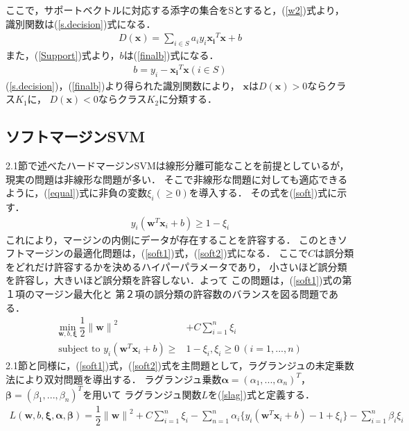 ここで，サポートベクトルに対応する添字の集合をSとすると，(\ref{w2})式より，
識別関数は(\ref{s.decision})式になる．
\begin{align}
    \label{s.decision}
    D(\boldsymbol{x}) = \sum_{i\in S}a_iy_i\boldsymbol{x_i}^T\boldsymbol{x} + b
\end{align}
また，(\ref{Support})式より，$b$は(\ref{finalb})式になる．
\begin{align}
  \label{finalb}
  b =y_i - \boldsymbol{x_i}^T\boldsymbol{x}(i \in S)
\end{align}
(\ref{s.decision})，(\ref{finalb})より得られた識別関数により，
$\boldsymbol{x}$は$D(\boldsymbol{x}) > 0$ならクラス$K_1$に，
$D(\boldsymbol{x}) < 0$ならクラス$K_2$に分類する．

\subsection{ソフトマージンSVM}
2.1節で述べたハードマージンSVMは線形分離可能なことを前提としているが，現実の問題は非線形な問題が多い．
そこで非線形な問題に対しても適応できるように，(\ref{equal})式に非負の変数$\xi_i(\geq 0)$を導入する．
その式を(\ref{soft})式に示す．
\begin{align}
    \label{soft}
    y_i(\boldsymbol{w}^T \boldsymbol{x}_i + b) \geq 1 - \xi_i
\end{align}
これにより，マージンの内側にデータが存在することを許容する．
このときソフトマージンの最適化問題は，(\ref{soft1})式，(\ref{soft2})式になる．
ここで$C$は誤分類をどれだけ許容するかを決めるハイパーパラメータであり，
小さいほど誤分類を許容し，大きいほど誤分類を許容しない．よって
この問題は，(\ref{soft1})式の第１項のマージン最大化と
第２項の誤分類の許容数のバランスを図る問題である．
\begin{align}
    \underset{\boldsymbol{w},b,\boldsymbol{\xi}}{\text{min}}~\dfrac{1}{2}{\|\boldsymbol{{w}}\|}^2
    &+C\sum_{i=1}^{n}\xi_i \label{soft1}\\
   \text{subject to } y_i(\boldsymbol{w}^T \boldsymbol{x}_i + b) \geq &1 - \xi_i,\xi_i \geq 0 ~(i=1,...,n)\label{soft2}
\end{align}
2.1節と同様に，(\ref{soft1})式，(\ref{soft2})式を主問題として，ラグランジュの未定乗数法により双対問題を導出する．
ラグランジュ乗数$\boldsymbol{\alpha} = (\alpha_1,...,\alpha_n)^T$，
$\boldsymbol{\beta} = (\beta_1,...,\beta_n)^T$を用いて
ラグランジュ関数$L$を(\ref{slag})式と定義する．
\begin{align}
    \label{slag}
    L(\boldsymbol{w},b,\boldsymbol{\xi},\boldsymbol{\alpha},\boldsymbol{\beta}) 
    = \dfrac{1}{2}{\|\boldsymbol{{w}}\|}^2+C\sum_{i=1}^{n}\xi_i
    - \sum_{n = 1}^{n} \alpha_i \{y_i(\boldsymbol{w}^T \boldsymbol{x}_i + b)-1+\xi_i\}
    -\sum_{i=1}^{n}\beta_i\xi_i
\end{align}
